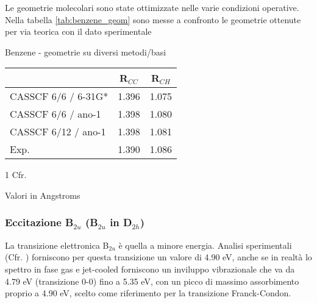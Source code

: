 Le geometrie molecolari sono state ottimizzate nelle varie condizioni
operative. Nella tabella \ref{tab:benzene_geom} sono messe a confronto le
geometrie ottenute per via teorica con il dato sperimentale
\begin{center}
\begin{threeparttable}
\caption{\small Benzene - geometrie su diversi metodi/basi}
\label{tab:benzene_geom}
\small
\begin{tabular}{|l|c|c|}
\hline
							& R$_{CC}$		& R$_{CH}$ \\ 
\hline
CASSCF 6/6 / 6-31G*			& 1.396			&	1.075	 \\
CASSCF 6/6 / ano-1			& 1.398			&	1.080	 \\
CASSCF 6/12 / ano-1			& 1.398			&	1.081    \\
Exp.\tnote{1}				& 1.390			&	1.086    \\
\hline
\end{tabular}
\begin{tablenotes}
\small
 \item[1] Cfr. \cite{jms-148-1991-427}
 \item[] Valori in Angstroms
\end{tablenotes}
\end{threeparttable}
\end{center}

\subsubsection{Eccitazione B$_{2u}$ (B$_{2u}$ in D$_{2h}$)}

La transizione elettronica B$_{2u}$ \`e quella a minore energia. Analisi
sperimentali (Cfr. \cite{jcp-94-12-1991-7700}) forniscono per questa
transizione un valore di 4.90 eV, anche se in realt\`a lo spettro in fase gas
e jet-cooled forniscono un inviluppo vibrazionale che va da 4.79 eV
(transizione 0-0) fino a 5.35 eV, con un picco di massimo assorbimento
proprio a 4.90 eV, scelto come riferimento per la transizione Franck-Condon.

